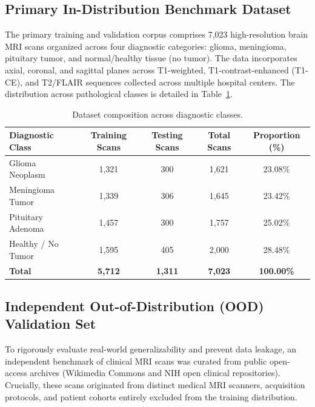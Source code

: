 \documentclass[runningheads]{llncs}
\begin{document}
\subsection{Primary In-Distribution Benchmark Dataset}
The primary training and validation corpus comprises 7,023 high-resolution brain MRI scans organized across four diagnostic categories: glioma, meningioma, pituitary tumor, and normal/healthy tissue (no tumor). The data incorporates axial, coronal, and sagittal planes across T1-weighted, T1-contrast-enhanced (T1-CE), and T2/FLAIR sequences collected across multiple hospital centers. The distribution across pathological classes is detailed in Table~\ref{tab:dataset}.

\begin{table}[h]
\centering
\caption{Dataset composition across diagnostic classes.}
\label{tab:dataset}
\begin{tabular}{lcccc}
\toprule
\textbf{Diagnostic Class} & \textbf{Training Scans} & \textbf{Testing Scans} & \textbf{Total Scans} & \textbf{Proportion (\%)} \\
\midrule
Glioma Neoplasm           & 1,321                   & 300                    & 1,621                & 23.08\% \\
Meningioma Tumor          & 1,339                   & 306                    & 1,645                & 23.42\% \\
Pituitary Adenoma         & 1,457                   & 300                    & 1,757                & 25.02\% \\
Healthy / No Tumor        & 1,595                   & 405                    & 2,000                & 28.48\% \\
\midrule
\textbf{Total}            & \textbf{5,712}          & \textbf{1,311}         & \textbf{7,023}       & \textbf{100.00\%} \\
\bottomrule
\end{tabular}
\end{table}

\subsection{Independent Out-of-Distribution (OOD) Validation Set}
To rigorously evaluate real-world generalizability and prevent data leakage, an independent benchmark of clinical MRI scans was curated from public open-access archives (Wikimedia Commons and NIH open clinical repositories). Crucially, these scans originated from distinct medical MRI scanners, acquisition protocols, and patient cohorts entirely excluded from the training distribution.
\end{document}
